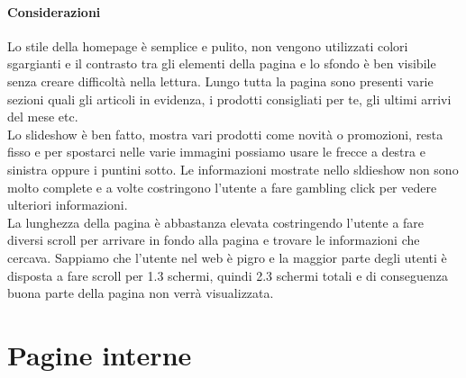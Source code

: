 \documentclass[12pt]{article}
\begin{document}
	\paragraph{Considerazioni}
	Lo stile della homepage è semplice e pulito, non vengono utilizzati colori sgargianti e il contrasto tra gli elementi della pagina e lo sfondo è ben visibile senza creare difficoltà nella lettura.
	Lungo tutta la pagina sono presenti varie sezioni quali gli articoli in evidenza, i prodotti consigliati per te, gli ultimi arrivi del mese etc. 
	\\
	Lo slideshow è ben fatto, mostra vari prodotti come novità o promozioni, resta fisso e per spostarci nelle varie immagini possiamo usare le frecce a destra e sinistra oppure i puntini sotto. Le informazioni mostrate nello sldieshow non sono molto complete e a volte costringono l'utente a fare gambling click per vedere ulteriori informazioni.\\
	La lunghezza della pagina è abbastanza elevata costringendo l'utente a fare diversi scroll per arrivare in fondo alla pagina e trovare le informazioni che cercava. Sappiamo che l'utente nel web è pigro e la maggior parte degli utenti è disposta a fare scroll per 1.3 schermi, quindi 2.3 schermi totali e di conseguenza buona parte della pagina non verrà visualizzata. 
	\section{Pagine interne}
\end{document}
